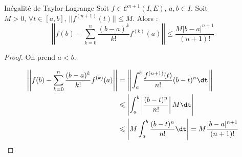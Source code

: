 \begin{proposition}{Inégalité de Taylor-Lagrange}{}
    Soit $f \in \mathscr C^{n + 1}(I, E)$, $a, b \in I$.  Soit $M > 0, \, \forall t \in [a, b], \, ||f^{(n + 1)}(t)|| \leqslant M$.
    Alors :
    \[\left|\left| f(b) - \sum_{k = 0 }^{n } \frac{(b - a)^k}{k!} f^{(k)}(a) \right|\right| \leqslant \frac{M |b - a|^{n + 1}}{(n + 1)!}\]
\end{proposition}

\begin{proof}
    On prend $a < b$.

    \begin{align*}
    \left|\left| f(b) - \sum_{k = 0}^n \frac{(b - a)^k}{k!} f^{(k)}(a) \right|\right|  & = \left|\left| \int_a^b \frac{f^{(n + 1)}(t)}{n!} (b - t)^n \dt \right|\right| \\
        & \leqslant \left| \int_a^b \left| \frac{(b - t)^n}{n!} \right| M \dt \right| \\
        & \leqslant \left| M \int_{a }^{b } \frac{(b - t)^n}{n!} \dt \right| = M \frac{|b - a|^{n + 1}}{(n+ 1)!}
    \end{align*}
\end{proof}
